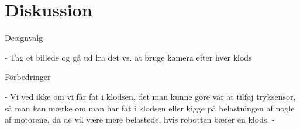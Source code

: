 \clearpage
\section{Diskussion}

Designvalg

 - Tag et billede og gå ud fra det vs. at bruge kamera efter hver klods

Forbedringer

 - Vi ved ikke om vi får fat i klodsen, det man kunne gøre var at tilføj tryksensor, så man kan mærke om man har fat i klodsen eller kigge på belastningen af nogle af motorene, da de vil være mere belastede, hvis robotten bærer en klods.
 - 
